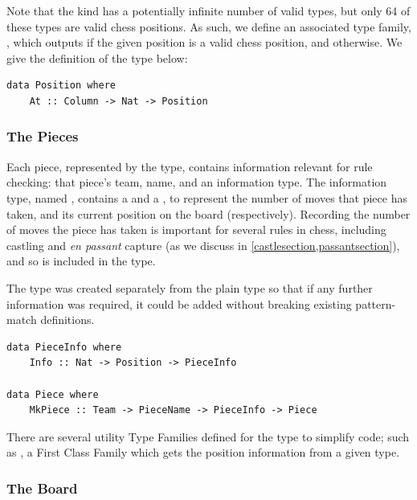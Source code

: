 Note that the  kind has a potentially infinite number of valid types, but only 64 of these types are valid chess positions. As such, we define an associated type family, , which outputs  if the given position is a valid chess position, and  otherwise. We give the definition of the  type below:

\begin{lstlisting}
data Position where
    At :: Column -> Nat -> Position
\end{lstlisting}

\subsubsection{The Pieces}

Each piece, represented by the  type, contains information relevant for rule checking: that piece's team, name, and an information type. The information type, named , contains a  and a , to represent the number of moves that piece has taken, and its current position on the board (respectively). Recording the number of moves the piece has taken is important for several rules in chess, including castling and \textit{en passant} capture (as we discuss in \cref{castlesection,passantsection}), and so is included in the  type.

The  type was created separately from the plain  type so that if any further information was required, it could be added without breaking existing  pattern-match definitions.

\begin{lstlisting}
data PieceInfo where
    Info :: Nat -> Position -> PieceInfo

data Piece where
    MkPiece :: Team -> PieceName -> PieceInfo -> Piece
\end{lstlisting}

There are several utility Type Families defined for the  type to simplify code; such as , a First Class Family which gets the position information from a given  type.

\subsubsection{The Board} \label{boardtypesection}

